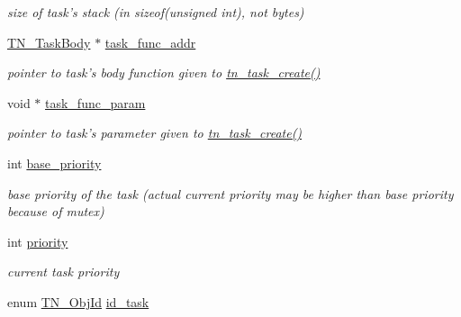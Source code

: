 \begin{DoxyCompactItemize}
\begin{DoxyCompactList}\small\item\em size of task's stack (in {\ttfamily sizeof(unsigned int)}, not bytes) \end{DoxyCompactList}\item 
\hypertarget{structTN__Task_a69c06e09b4d2a8a258f0733b58324139}{\hyperlink{tn__common_8h_a82f7de9034cbbb373c4dbcff45942343}{T\+N\+\_\+\+Task\+Body} $\ast$ \hyperlink{structTN__Task_a69c06e09b4d2a8a258f0733b58324139}{task\+\_\+func\+\_\+addr}}\label{structTN__Task_a69c06e09b4d2a8a258f0733b58324139}

\begin{DoxyCompactList}\small\item\em pointer to task's body function given to {\ttfamily \hyperlink{tn__tasks_8h_a548d5adda09d1b4e393b5df0e9e1a7a5}{tn\+\_\+task\+\_\+create()}} \end{DoxyCompactList}\item 
\hypertarget{structTN__Task_a55c62af79c5b4fdc2f1b414d409afe73}{void $\ast$ \hyperlink{structTN__Task_a55c62af79c5b4fdc2f1b414d409afe73}{task\+\_\+func\+\_\+param}}\label{structTN__Task_a55c62af79c5b4fdc2f1b414d409afe73}

\begin{DoxyCompactList}\small\item\em pointer to task's parameter given to {\ttfamily \hyperlink{tn__tasks_8h_a548d5adda09d1b4e393b5df0e9e1a7a5}{tn\+\_\+task\+\_\+create()}} \end{DoxyCompactList}\item 
\hypertarget{structTN__Task_a7775b785b3f0b57918e9a0c88491a069}{int \hyperlink{structTN__Task_a7775b785b3f0b57918e9a0c88491a069}{base\+\_\+priority}}\label{structTN__Task_a7775b785b3f0b57918e9a0c88491a069}

\begin{DoxyCompactList}\small\item\em base priority of the task (actual current priority may be higher than base priority because of mutex) \end{DoxyCompactList}\item 
\hypertarget{structTN__Task_a43c9c73249da8faa1177587786c40616}{int \hyperlink{structTN__Task_a43c9c73249da8faa1177587786c40616}{priority}}\label{structTN__Task_a43c9c73249da8faa1177587786c40616}

\begin{DoxyCompactList}\small\item\em current task priority \end{DoxyCompactList}\item 
\hypertarget{structTN__Task_a014a0a70ae6a23d08b1571ac6b017abd}{enum \hyperlink{tn__common_8h_ae779dd1f6735f6e139fb70acd004d976}{T\+N\+\_\+\+Obj\+Id} \hyperlink{structTN__Task_a014a0a70ae6a23d08b1571ac6b017abd}{id\+\_\+task}}\label{structTN__Task_a014a0a70ae6a23d08b1571ac6b017abd}


\end{DoxyCompactItemize}
